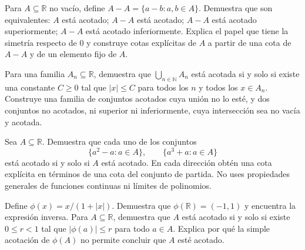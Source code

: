 \begin{samepage}
\begin{problem}\label{prob:reto-acotacion-04}
Para $A\subseteq\mathbb R$ no vacío, define $A-A=\{a-b:a,b\in A\}$. Demuestra que son equivalentes: $A$ está acotado; $A-A$ está acotado; $A-A$ está acotado superiormente; $A-A$ está acotado inferiormente. Explica el papel que tiene la simetría respecto de $0$ y construye cotas explícitas de $A$ a partir de una cota de $A-A$ y de un elemento fijo de $A$.
\end{problem}
\end{samepage}
\par{}

\begin{samepage}
\begin{problem}\label{prob:reto-acotacion-05}
Para una familia $A_n\subseteq\mathbb R$, demuestra que $\bigcup_{n\in\mathbb N}A_n$ está acotada si y solo si existe una constante $C\ge0$ tal que $|x|\le C$ para todos los $n$ y todos los $x\in A_n$. Construye una familia de conjuntos acotados cuya unión no lo esté, y dos conjuntos no acotados, ni superior ni inferiormente, cuya intersección sea no vacía y acotada.
\end{problem}
\end{samepage}
\par{}

\begin{samepage}
\begin{problem}\label{prob:reto-acotacion-06}
Sea $A\subseteq\mathbb R$. Demuestra que cada uno de los conjuntos
\[
\{a^2-a:a\in A\},\qquad \{a^3+a:a\in A\}
\]
está acotado si y solo si $A$ está acotado. En cada dirección obtén una cota explícita en términos de una cota del conjunto de partida. No uses propiedades generales de funciones continuas ni límites de polinomios.
\end{problem}
\end{samepage}
\par{}

\begin{samepage}
\begin{problem}\label{prob:reto-acotacion-07}
Define $\phi(x)=x/(1+|x|)$. Demuestra que $\phi(\mathbb R)=(-1,1)$ y encuentra la expresión inversa. Para $A\subseteq\mathbb R$, demuestra que $A$ está acotado si y solo si existe $0\le r<1$ tal que $|\phi(a)|\le r$ para todo $a\in A$. Explica por qué la simple acotación de $\phi(A)$ no permite concluir que $A$ esté acotado.~\cite{mseCompresion}
\end{problem}
\end{samepage}
\par{}


